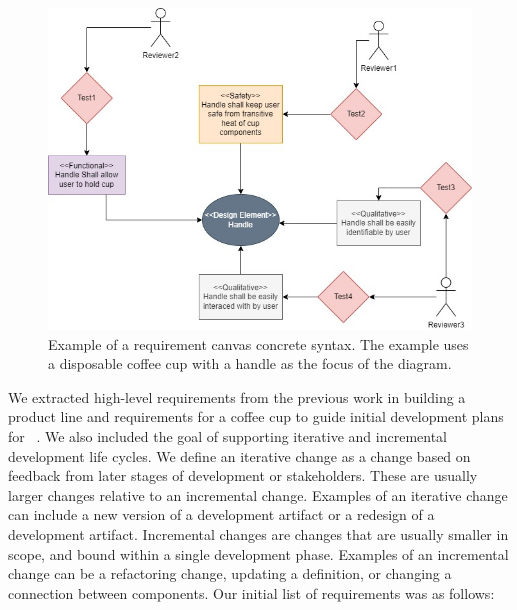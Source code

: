 \begin{figure}[hbt!]
	\centering
	\includegraphics[width=\columnwidth]{Figures/CoffeCup_ReqModel.jpg}
	\caption{Example of a requirement canvas concrete syntax. The example uses a disposable coffee cup with a handle as the focus of the diagram.}
	\label{fig:CoffeCup_ReqModel}
\end{figure}

We extracted high-level requirements from the previous work in building a product line and requirements for a coffee cup to guide initial development plans for \tool~\cite{chiang2024mapping}. We also included the goal of supporting iterative and incremental development life cycles. We define an iterative change as a change based on feedback from later stages of development or stakeholders. These are usually larger changes relative to an incremental change. Examples of an iterative change can include a new version of a development artifact or a redesign of a development artifact. Incremental changes are changes that are usually smaller in scope, and bound within a single development phase. Examples of an incremental change can be a refactoring change, updating a definition, or changing a connection between components. Our initial list of requirements was as follows:

